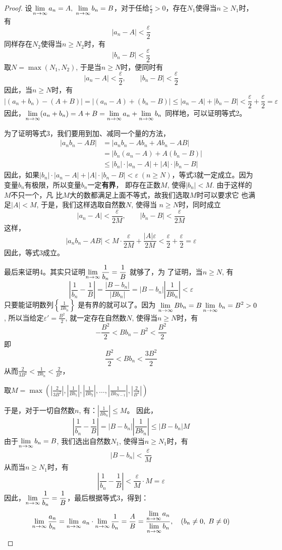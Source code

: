 \begin{proof}
    设$\displaystyle\lim_{n\to\infty}a_n=A,\; \displaystyle\lim_{n\to\infty}b_n=B$，对于任给$\frac{\varepsilon}{2}>0$，存在$N_1$使得当$n\ge N_1$时，有
\[|a_n-A|<\frac{\varepsilon}{2}\]
    同样存在$N_2$使得当$n\ge N_2$时，有
    \[|b_n-B|<\frac{\varepsilon}{2}\]
    取$N=\max(N_1,N_2)$, 于是当$n\ge N$时，便同时有
\[|a_n-A|<\frac{\varepsilon}{2},\qquad |b_n-B|<\frac{\varepsilon}{2}\]
    因此，当$n\ge N$时，有
\[|(a_n+b_n)-(A+B)|=|(a_n-A)+(b_n-B)|\le |a_n-A|+|b_n-B|<\frac{\varepsilon}{2}+\frac{\varepsilon}{2}=\varepsilon\]
因此，$\displaystyle\lim_{n\to\infty}(a_n+b_n)=A+B=\displaystyle\lim_{n\to\infty}a_n+\displaystyle\lim_{n\to\infty}b_n$
同样地，可以证明等式2。

为了证明等式3，我们要用到加、减同一个量的方法，
\[\begin{split}
    |a_nb_n - AB| &= |a_nb_n - Ab_n + Ab_n -AB|\\
&=|b_n(a_n-A)+A(b_n-B)|\\
&\le |b_n|\cdot |a_n-A|+|A|\cdot |b_n-B|
\end{split}\]
因此，如果$|b_n|\cdot |a_n-A|+|A|\cdot |b_n-B|<\varepsilon\; (n\ge N)$，等式3就一定成立。因为变量$b_n$有极限，所以变量$b_n$一定\textbf{有界}，
即存在正数$M$, 使得$|b_n|<M$. 由于这样的$M$不只一个，凡
比$M$大的数都满足上面不等式，故我们选取$M$时可以要求它
也满足$|A|<M$, 于是，我们这样选取自然数$N$, 使得当
$n\ge N$时，同时成立
\[|a_n-A|<\frac{\varepsilon}{2M},\qquad |b_n-B|<\frac{\varepsilon}{2M}\]
这样，
\[|a_nb_n-AB|<M\cdot \frac{\varepsilon}{2M}+\frac{|A|\varepsilon}{2M}<\frac{\varepsilon}{2}+\frac{\varepsilon}{2}=\varepsilon\]
因此，等式3成立。

最后来证明4。其实只证明$\displaystyle\lim_{n\to\infty}\dfrac{1}{b_n}=\dfrac{1}{B}$
就够了，为
了证明，当$n\ge N$, 有
\[\left|\frac{1}{b_n}-\frac{1}{B}\right|=\frac{|B-b_n|}{|Bb_n|}=|B-b_n|\left|\frac{1}{Bb_n}\right|<\varepsilon\]
只要能证明数列$\left\{\frac{1}{Bb_n}\right\}$
是有界的就可以了。因为
$\displaystyle\lim_{n\to\infty}Bb_n=B\displaystyle\lim_{n\to\infty}b_n=B^2>0$, 所以当给定$\varepsilon'=\frac{B^2}{2}$, 
就一定存在自然数$N$, 使得当$n\ge N$时，有
\[-\frac{B^2}{2}<Bb_n-B^2<\frac{B^2}{2}\]
即
\[\frac{B^2}{2}<Bb_n<\frac{3B^2}{2}\]
从而$\frac{2}{3B^2}<\frac{1}{Bb_n}<\frac{2}{B^2}$，

取$M=\max\left(\left|\frac{2}{3B^2}\right|, \left|\frac{1}{Bb_1}\right|, \left|\frac{1}{Bb_2}\right|, \ldots, \left|\frac{1}{Bb_{N-1}}\right|,\left|\frac{2}{B^2}\right|\right)$

于是，对于一切自然数$n$, 有：$\left|\frac{1}{Bb_n}\right|\le M$。
因此，
\[\left|\frac{1}{b_n}-\frac{1}{B}\right|=|B-b_n|\left|\frac{1}{Bb_n}\right|\le |B-b_n|M\]
由于$\displaystyle\lim_{n\to\infty}b_n=B$, 我们选出自然数$N_1$, 使得当$n\ge N_1$时，有
\[|B-b_n|<\frac{\varepsilon}{M}\]
从而当$n\ge N_1$时，有
\[\left|\frac{1}{b_n}-\frac{1}{B}\right|<\frac{\varepsilon}{M}\cdot M=\varepsilon\]
因此，$\displaystyle\lim_{n\to\infty}\dfrac{1}{b_n}=\dfrac{1}{B}$，最后根据等式3，得到：
\[\displaystyle\lim_{n\to\infty}\dfrac{a_n}{b_n}=\displaystyle\lim_{n\to\infty}a_n\cdot \displaystyle\lim_{n\to\infty}\dfrac{1}{b_n}=\dfrac{A}{B}=\dfrac{\displaystyle\lim_{n\to\infty}a_n}{\displaystyle\lim_{n\to\infty}b_n},\quad (b_n\ne 0,\; B\ne 0)\]
\end{proof}

